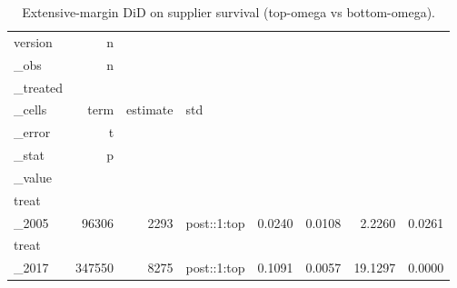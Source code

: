 \begin{table}[ht]
\centering
\caption{Extensive-margin DiD on supplier survival (top-omega vs bottom-omega).} 
\begin{tabular}{lrrlrrrr}
  \toprule
version & n\\_obs & n\\_treated\\_cells & term & estimate & std\\_error & t\\_stat & p\\_value \\ 
  \midrule
treat\\_2005 & 96306 &  2293 & post::1:top & 0.0240 & 0.0108 & 2.2260 & 0.0261 \\ 
  treat\\_2017 & 347550 &  8275 & post::1:top & 0.1091 & 0.0057 & 19.1297 & 0.0000 \\ 
   \bottomrule
\end{tabular}
\end{table}
